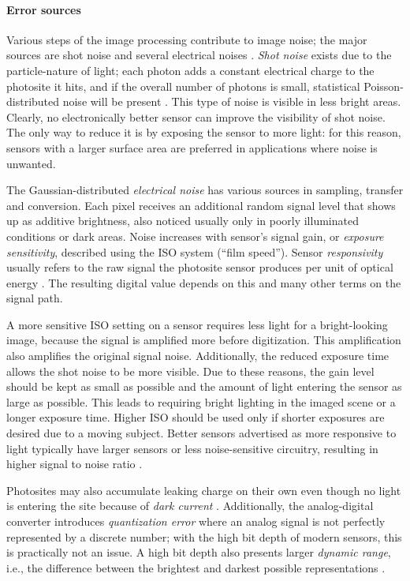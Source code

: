 \paragraph{Error sources}
Various steps of the image processing contribute to image noise; the major sources are shot noise and several electrical noises \cite{szeliski10vision,litwiller2001ccd}.
\emph{Shot noise} exists due to the particle-nature of light; each photon adds a constant electrical charge to the photosite it hits, and if the overall number of photons is small, statistical Poisson-distributed noise will be present \cite[p.~74]{nakamura2005image}.
This type of noise is visible in less bright areas.
Clearly, no electronically better sensor can improve the visibility of shot noise.
The only way to reduce it is by exposing the sensor to more light: for this reason, sensors with a larger surface area are preferred in applications where noise is unwanted.

The Gaussian-distributed \emph{electrical noise} has various sources in sampling, transfer and conversion.
Each pixel receives an additional random signal level that shows up as additive brightness, also noticed usually only in poorly illuminated conditions or dark areas.
Noise increases with sensor's signal gain, or \emph{exposure sensitivity}, described using the ISO system (``film speed'').
Sensor \emph{responsivity} usually refers to the raw signal the photosite sensor produces per unit of optical energy \cite[p.~78]{nakamura2005image}.
The resulting digital value depends on this and many other terms on the signal path.

A more sensitive ISO setting on a sensor requires less light for a bright-looking image, because the signal is amplified more before digitization.
This amplification also amplifies the original signal noise.
Additionally, the reduced exposure time allows the shot noise to be more visible.
Due to these reasons, the gain level should be kept as small as possible and the amount of light entering the sensor as large as possible.
This leads to requiring bright lighting in the imaged scene or a longer exposure time.
Higher ISO should be used only if shorter exposures are desired due to a moving subject.
Better sensors advertised as more responsive to light typically have larger sensors or less noise-sensitive circuitry, resulting in higher signal to noise ratio \cite{el2005cmos}.

Photosites may also accumulate leaking charge on their own even though no light is entering the site because of \emph{dark current} \cite{el2005cmos,litwiller2001ccd}.
Additionally, the analog-digital converter introduces \emph{quantization error} where an analog signal is not perfectly represented by a discrete number; with the high bit depth of modern sensors, this is practically not an issue.
A high bit depth also presents larger \emph{dynamic range}, i.e., the difference between the brightest and darkest possible representations \cite{el2005cmos,litwiller2001ccd}.

